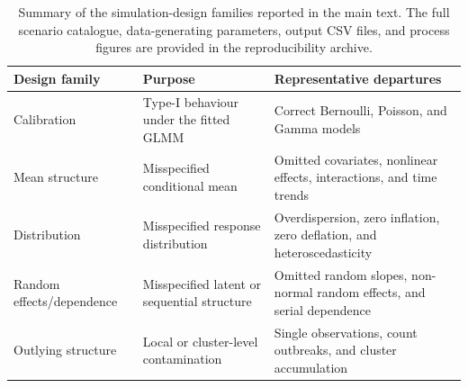\begin{table}[htbp]
\small
\caption{Summary of the simulation-design families reported in the main text. The full scenario catalogue, data-generating parameters, output CSV files, and process figures are provided in the reproducibility archive.}
\label{tab:simulation-design-summary}
\begin{tabularx}{\textwidth}{@{}>{\raggedright\arraybackslash}p{}>{\raggedright\arraybackslash}p{}>{\raggedright\arraybackslash}X@{}}
\toprule
Design family & Purpose & Representative departures \\
\midrule
Calibration & Type-I behaviour under the fitted GLMM & Correct Bernoulli, Poisson, and Gamma models \\
Mean structure & Misspecified conditional mean & Omitted covariates, nonlinear effects, interactions, and time trends \\
Distribution & Misspecified response distribution & Overdispersion, zero inflation, zero deflation, and heteroscedasticity \\
Random effects/dependence & Misspecified latent or sequential structure & Omitted random slopes, non-normal random effects, and serial dependence \\
Outlying structure & Local or cluster-level contamination & Single observations, count outbreaks, and cluster accumulation \\
\bottomrule
\end{tabularx}
\end{table}
